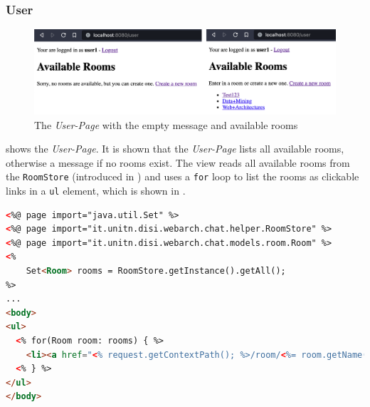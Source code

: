 \subsubsection{User}\label{subsubsec:03_impl_servlets_user}
\begin{figure}[h]
\centering
\includegraphics[scale=0.2]{images/03_impl/user/userpage_before_after}
\caption{The \textit{User-Page} with the empty message and available rooms}
\label{fig:03_impl_servlets_user_beforeafter}
\end{figure}
 shows the \textit{User-Page}. It is shown that the \textit{User-Page} lists all available rooms, otherwise a message if no rooms exist.
The view reads all available rooms from the \texttt{RoomStore} (introduced in ) and uses a \texttt{for} loop to list the rooms as clickable links in a \texttt{ul} element, which is shown in .
\newpage
\begin{lstlisting}[label=lst:03_impl_servlets_user, caption=List all available rooms, language=html]
<%@ page import="java.util.Set" %>
<%@ page import="it.unitn.disi.webarch.chat.helper.RoomStore" %>
<%@ page import="it.unitn.disi.webarch.chat.models.room.Room" %>
<%
    Set<Room> rooms = RoomStore.getInstance().getAll();
%>
...
<body>
<ul>
  <% for(Room room: rooms) { %>
    <li><a href="<% request.getContextPath(); %>/room/<%= room.getName() %>"><%= room.getName() %></a></li>
  <% } %>
</ul>
</body>
\end{lstlisting}


